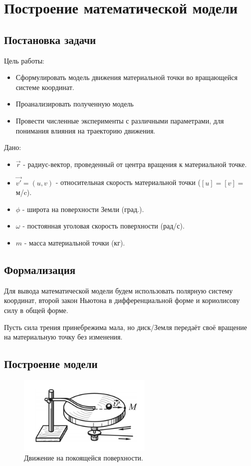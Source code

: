 \chapter{Построение математической модели}
\section{Постановка задачи}
Цель работы:
\begin{itemize}
	\item Сформулировать модель движения материальной точки во вращающейся системе координат.
	\item Проанализировать полученную модель
	\item Провести численные эксперименты с различными параметрами, для понимания влияния на траекторию движения.
\end{itemize}

Дано:
\begin{itemize}
	\item $\overrightarrow{r}$ - радиус-вектор, проведенный от центра вращения к материальной точке.
	\item $\overrightarrow{v'} = (u,v)$ - относительная скорость материальной точки ($[u] = [v]=$м/c).
	\item $\phi$ - широта на поверхности Земли (град.).
	\item $\omega$ - постоянная уголовая скорость поверхности (рад/с).
	\item $m$ - масса материальной точки (кг).
\end{itemize}
\section{Формализация}
Для вывода математической модели будем использовать полярную систему координат, второй закон Ньютона в дифференциальной форме и кориолисову силу в общей форме.

Пусть сила трения принебрежима мала, но диск/Земля передаёт своё вращение на материальную точку без изменения.
\newpage
\section{Построение модели}
\begin{figure}[h]  %
	\centering
	\includegraphics[height=0.2\textwidth]{imgs/base.png}  %
	\caption{Движение на покоящейся поверхности.}  %
	\label{fig:base}  %
\end{figure}

